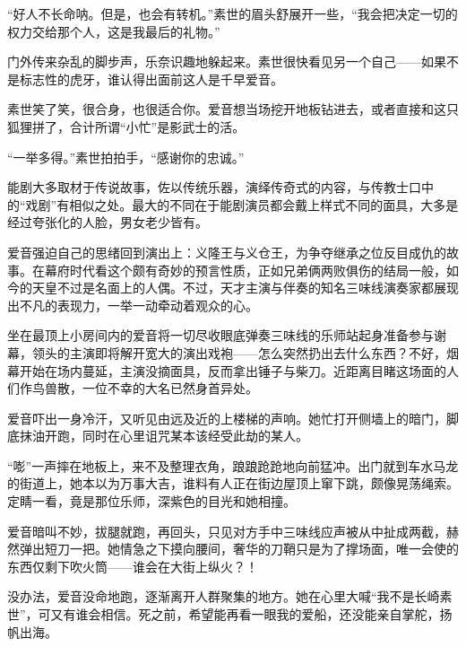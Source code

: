 \documentclass{article}
\begin{document}
“好人不长命呐。但是，也会有转机。”素世的眉头舒展开一些，“我会把决定一切的权力交给那个人，这是我最后的礼物。”



门外传来杂乱的脚步声，乐奈识趣地躲起来。素世很快看见另一个自己——如果不是标志性的虎牙，谁认得出面前这人是千早爱音。



素世笑了笑，很合身，也很适合你。爱音想当场挖开地板钻进去，或者直接和这只狐狸拼了，合计所谓“小忙”是影武士的活。



“一举多得。”素世拍拍手，“感谢你的忠诚。”



能剧大多取材于传说故事，佐以传统乐器，演绎传奇式的内容，与传教士口中的“戏剧”有相似之处。最大的不同在于能剧演员都会戴上样式不同的面具，大多是经过夸张化的人脸，男女老少皆有。



爱音强迫自己的思绪回到演出上：义隆王与义仓王，为争夺继承之位反目成仇的故事。在幕府时代看这个颇有奇妙的预言性质，正如兄弟俩两败俱伤的结局一般，如今的天皇不过是名面上的人偶。不过，天才主演与伴奏的知名三味线演奏家都展现出不凡的表现力，一举一动牵动着观众的心。



坐在最顶上小房间内的爱音将一切尽收眼底弹奏三味线的乐师站起身准备参与谢幕，领头的主演即将解开宽大的演出戏袍——怎么突然扔出去什么东西？不好，烟幕开始在场内蔓延，主演没摘面具，反而拿出锤子与柴刀。近距离目睹这场面的人们作鸟兽散，一位不幸的大名已然身首异处。



爱音吓出一身冷汗，又听见由远及近的上楼梯的声响。她忙打开侧墙上的暗门，脚底抹油开跑，同时在心里诅咒某本该经受此劫的某人。



“嘭”一声摔在地板上，来不及整理衣角，踉踉跄跄地向前猛冲。出门就到车水马龙的街道上，她本以为万事大吉，谁料有人正在街边屋顶上窜下跳，颇像晃荡绳索。定睛一看，竟是那位乐师，深紫色的目光和她相撞。



爱音暗叫不妙，拔腿就跑，再回头，只见对方手中三味线应声被从中扯成两截，赫然弹出短刀一把。她情急之下摸向腰间，奢华的刀鞘只是为了撑场面，唯一会使的东西仅剩下吹火筒——谁会在大街上纵火？！



没办法，爱音没命地跑，逐渐离开人群聚集的地方。她在心里大喊“我不是长崎素世”，可又有谁会相信。死之前，希望能再看一眼我的爱船，还没能亲自掌舵，扬帆出海。
\end{document}
